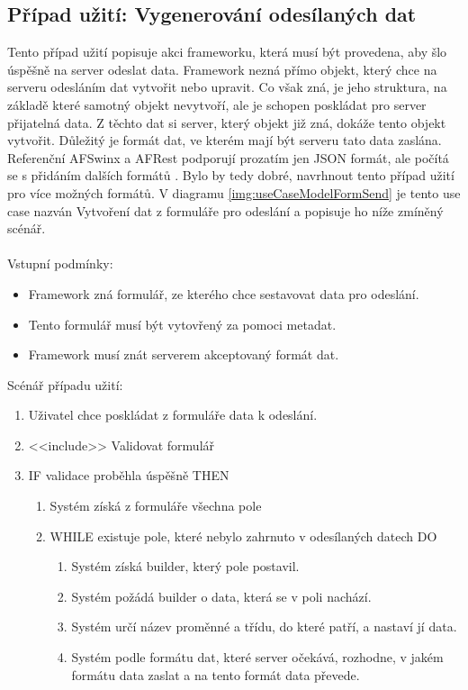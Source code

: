 \subsection{Případ užití: Vygenerování odesílaných dat}
Tento případ užití popisuje akci frameworku, která musí být provedena, aby šlo úspěšně na server odeslat data. Framework nezná přímo objekt, který chce na serveru odesláním dat vytvořit nebo upravit. Co však zná, je jeho struktura, na základě které samotný objekt nevytvoří, ale je schopen poskládat pro server přijatelná data. Z těchto dat si server, který objekt již zná, dokáže tento objekt vytvořit. Důležitý je formát dat, ve kterém mají být serveru tato data zaslána. Referenční AFSwinx a AFRest podporují prozatím jen JSON formát, ale počítá se s přidáním dalších formátů \cite{tomasek-thesis}. Bylo by tedy dobré, navrhnout tento případ užití pro více možných formátů. V diagramu \ref{img:useCaseModelFormSend} je tento use case nazván Vytvoření dat z formuláře pro odeslání a popisuje ho níže zmíněný scénář.\\\\
Vstupní podmínky:
\begin{itemize}
\item Framework zná formulář, ze kterého chce sestavovat data pro odeslání. 
\item Tento formulář musí být vytovřený za pomoci metadat. 
\item Framework musí znát serverem akceptovaný formát dat. 
\end{itemize}
Scénář případu užití:
\begin{enumerate}
\item Uživatel chce poskládat z formuláře data k odeslání.
\item <<include>> Validovat formulář
\item IF validace proběhla úspěšně THEN
\begin{enumerate}
\item Systém získá z formuláře všechna pole
\item WHILE existuje pole, které nebylo zahrnuto v odesílaných datech DO
\begin{enumerate}
\item Systém získá builder, který pole postavil.
\item Systém požádá builder o data, která se v poli nachází.
\item  Systém určí název proměnné a třídu, do které patří, a nastaví jí data.
\item  Systém podle formátu dat, které server očekává, rozhodne, v jakém formátu data zaslat a na tento formát data převede. 
\end{enumerate}
\end{enumerate}
\end{enumerate}

